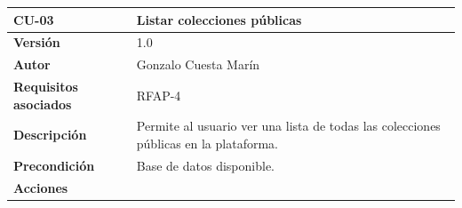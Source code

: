 \documentclass[
]{article}
\begin{document}
\begin{longtable}[]{@{}ll@{}}
\toprule
\begin{minipage}[b]{0.22\columnwidth}\raggedright
\textbf{CU-03}\strut
\end{minipage} & \begin{minipage}[b]{0.72\columnwidth}\raggedright
\textbf{Listar colecciones públicas}\strut
\end{minipage}\tabularnewline
\midrule
\endhead
\begin{minipage}[t]{0.22\columnwidth}\raggedright
\textbf{Versión}\strut
\end{minipage} & \begin{minipage}[t]{0.72\columnwidth}\raggedright
1.0\strut
\end{minipage}\tabularnewline
\begin{minipage}[t]{0.22\columnwidth}\raggedright
\textbf{Autor}\strut
\end{minipage} & \begin{minipage}[t]{0.72\columnwidth}\raggedright
Gonzalo Cuesta Marín\strut
\end{minipage}\tabularnewline
\begin{minipage}[t]{0.22\columnwidth}\raggedright
\textbf{Requisitos asociados}\strut
\end{minipage} & \begin{minipage}[t]{0.72\columnwidth}\raggedright
RFAP-4\strut
\end{minipage}\tabularnewline
\begin{minipage}[t]{0.22\columnwidth}\raggedright
\textbf{Descripción}\strut
\end{minipage} & \begin{minipage}[t]{0.72\columnwidth}\raggedright
Permite al usuario ver una lista de todas las colecciones públicas en la
plataforma.\strut
\end{minipage}\tabularnewline
\begin{minipage}[t]{0.22\columnwidth}\raggedright
\textbf{Precondición}\strut
\end{minipage} & \begin{minipage}[t]{0.72\columnwidth}\raggedright
Base de datos disponible.\strut
\end{minipage}\tabularnewline
\begin{minipage}[t]{0.22\columnwidth}\raggedright
\textbf{Acciones}\strut
\end{minipage} & \begin{minipage}[t]{0.72\columnwidth}\raggedright
\begin{enumerate}

\end{enumerate}
\end{minipage}
\end{longtable}
\end{document}
